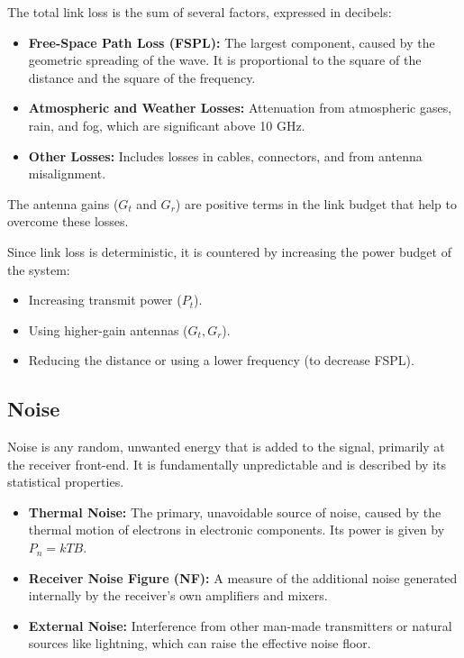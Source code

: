 The total link loss is the sum of several factors, expressed in decibels:
\begin{itemize}
    \item \textbf{Free-Space Path Loss (FSPL):} The largest component, caused by the geometric spreading of the wave. It is proportional to the square of the distance and the square of the frequency.
    \item \textbf{Atmospheric and Weather Losses:} Attenuation from atmospheric gases, rain, and fog, which are significant above 10 GHz.
    \item \textbf{Other Losses:} Includes losses in cables, connectors, and from antenna misalignment.
\end{itemize}
The antenna gains ($G_t$ and $G_r$) are positive terms in the link budget that help to overcome these losses.

Since link loss is deterministic, it is countered by increasing the power budget of the system:
\begin{itemize}
    \item Increasing transmit power ($P_t$).
    \item Using higher-gain antennas ($G_t, G_r$).
    \item Reducing the distance or using a lower frequency (to decrease FSPL).
\end{itemize}


\subsection{Noise}

Noise is any random, unwanted energy that is added to the signal, primarily at the receiver front-end. It is fundamentally unpredictable and is described by its statistical properties.

\begin{itemize}
    \item \textbf{Thermal Noise:} The primary, unavoidable source of noise, caused by the thermal motion of electrons in electronic components. Its power is given by $P_n = kTB$.
    \item \textbf{Receiver Noise Figure (NF):} A measure of the additional noise generated internally by the receiver's own amplifiers and mixers.
    \item \textbf{External Noise:} Interference from other man-made transmitters or natural sources like lightning, which can raise the effective noise floor.
\end{itemize}

